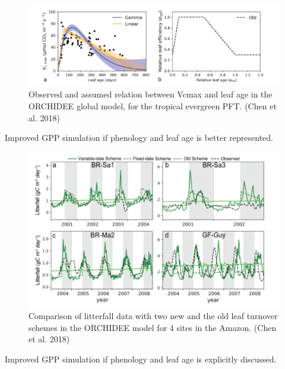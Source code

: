 \documentclass[
  12pt,
  oneside]{book}
\begin{document}
\begin{figure}

{\centering \includegraphics[width=0.8\linewidth]{figures/chap4/f411_chen1} 

}

\caption{Observed and assumed relation between Vcmax and leaf age in the ORCHIDEE global model, for the tropical evergreen PFT. (Chen et al. 2018)}\label{fig:f411}
\end{figure}

Improved GPP simulation if phenology and leaf age is better represented.

\begin{figure}

{\centering \includegraphics[width=0.8\linewidth]{figures/chap4/f412_chen2} 

}

\caption{Comparison of litterfall data with two new and the old leaf turnover schemes in the ORCHIDEE model for 4 sites in the Amazon. (Chen et al. 2018)}\label{fig:f412}
\end{figure}

Improved GPP simulation if phenology and leaf age is explicitly discussed.
\end{document}
